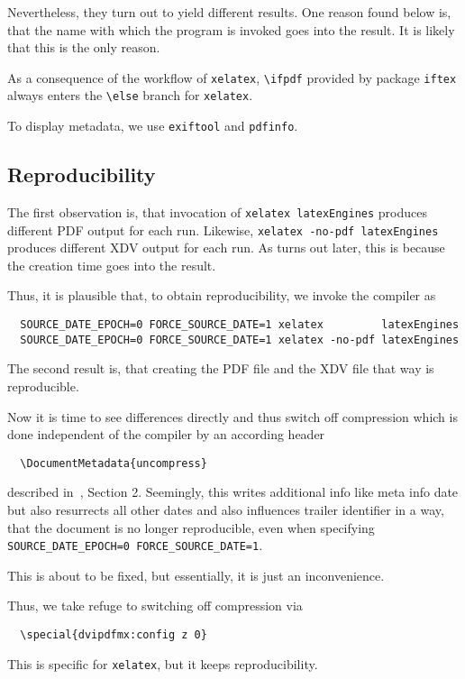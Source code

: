 \documentclass[a4paper]{article}%
\newcommand{\xelatex}{\texttt{xelatex}}
\newcommand{\cmd}[1]{\texttt{\textbackslash#1}}
\begin{document}
Nevertheless, they turn out to yield different results. 
One reason found below is, 
that the name with which the program is invoked 
goes into the result. 
It is likely that this is the only reason. 

As a consequence of the workflow of \xelatex, 
\cmd{ifpdf} provided by package \texttt{iftex} 
always enters the \cmd{else} branch for \xelatex. 

To display metadata, we use \texttt{exiftool} and \texttt{pdfinfo}. 


\subsection{Reproducibility}\label{subsec:reprod}

The first observation is, that invocation of \texttt{xelatex latexEngines} 
produces different PDF output for each run. 
Likewise, \texttt{xelatex -no-pdf latexEngines} produces different XDV output for each run. 
As turns out later, this is because the creation time goes into the result. 

Thus, it is plausible that, to obtain reproducibility, we invoke the compiler as 
%
\begin{verbatim}
  SOURCE_DATE_EPOCH=0 FORCE_SOURCE_DATE=1 xelatex         latexEngines
  SOURCE_DATE_EPOCH=0 FORCE_SOURCE_DATE=1 xelatex -no-pdf latexEngines
\end{verbatim}

The second result is, that creating the PDF file and the XDV file that way is reproducible. 

Now it is time to see differences directly and thus switch off compression 
which is done independent of the compiler by an according header 
%
\begin{verbatim}
  \DocumentMetadata{uncompress}
\end{verbatim}
%
described in~\cite{DocMetaDataSuppCode}, Section 2. 
Seemingly, this writes additional info like meta info date 
but also resurrects all other dates and also influences trailer identifier in a way, 
that the document is no longer reproducible, 
even when specifying \texttt{SOURCE\_DATE\_EPOCH=0 FORCE\_SOURCE\_DATE=1}. 

This is about to be fixed, 
but essentially, it is just an inconvenience. 

Thus, we take refuge to switching off compression via 
%
\begin{verbatim}
  \special{dvipdfmx:config z 0}
\end{verbatim}
%
This is specific for \xelatex, but it keeps reproducibility. 
\end{document}
